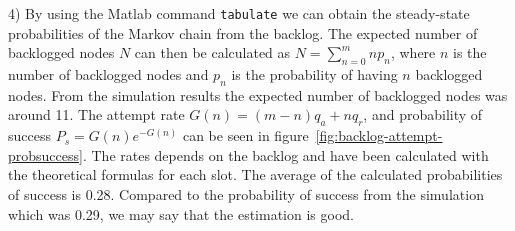 \documentclass{article}
\begin{document}
4) By using the Matlab command \texttt{tabulate} we can obtain the steady-state probabilities of the Markov chain from the backlog. The expected number of backlogged nodes $N$ can then be calculated as $N = \sum_{n=0}^{m}{np_n}$, where $n$ is the number of backlogged nodes and $p_n$ is the probability of having $n$ backlogged nodes. From the simulation results the expected number of backlogged nodes was around 11. The attempt rate $G(n) = (m-n)q_a + nq_r$, and probability of success $P_s = G(n)e^{-G(n)}$ can be seen in figure~\ref{fig:backlog-attempt-probsuccess}. The rates depends on the backlog and have been calculated with the theoretical formulas for each slot. The average of the calculated probabilities of success is 0.28. Compared to the probability of success from the simulation which was 0.29, we may say that the estimation is good. 
\end{document}
